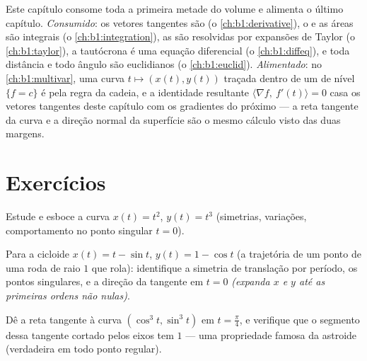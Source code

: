 \begin{remark}
\label{rem:b1:curves:perspectives}
Este capítulo consome toda a primeira metade do volume e alimenta o
último capítulo. \emph{Consumido}: os vetores tangentes são 
(o \cref{ch:b1:derivative}), o  e as áreas são integrais (o \cref{ch:b1:integration}),
as  são resolvidas por expansões de Taylor (o \cref{ch:b1:taylor}), a
tautócrona é uma equação diferencial  (o \cref{ch:b1:diffeq}), e toda
distância e todo ângulo são euclidianos (o \cref{ch:b1:euclid}).
\emph{Alimentado}: no \cref{ch:b1:multivar}, uma curva $t \mapsto (x(t),
y(t))$ traçada dentro de um
 de nível $\{f = c\}$ é  pela regra da cadeia, e a
identidade resultante $\langle \nabla f,\
f'(t)\rangle = 0$ casa os vetores tangentes deste capítulo
com os gradientes do próximo --- a reta tangente da curva e a direção
normal da superfície são o mesmo cálculo visto das duas margens.
\end{remark}

\section{Exercícios}

\begin{exercise}[$\star$]\label{exo:b1:curves:1}
Estude e esboce a curva $x(t) = t^2$, $y(t) = t^3$ (simetrias, variações,
comportamento no ponto singular $t = 0$).
\end{exercise}

\begin{exercise}[$\star$]\label{exo:b1:curves:2}
Para a cicloide $x(t) = t - \sin t$, $y(t) = 1 - \cos t$ (a trajetória de um ponto de uma roda de
raio $1$ que rola): identifique a simetria de translação por período,
os pontos singulares, e a direção da tangente em $t = 0$
\emph{(expanda $x$ e $y$ até as primeiras ordens não nulas)}.
\end{exercise}

\begin{exercise}[$\star$]\label{exo:b1:curves:3}
Dê a reta tangente à curva $(\cos^3 t, \sin^3 t)$ em $t =
\frac\pi4$, e verifique que o segmento
dessa tangente cortado pelos eixos tem  $1$ --- uma
propriedade famosa da astroide (verdadeira em todo ponto regular).
\end{exercise}

